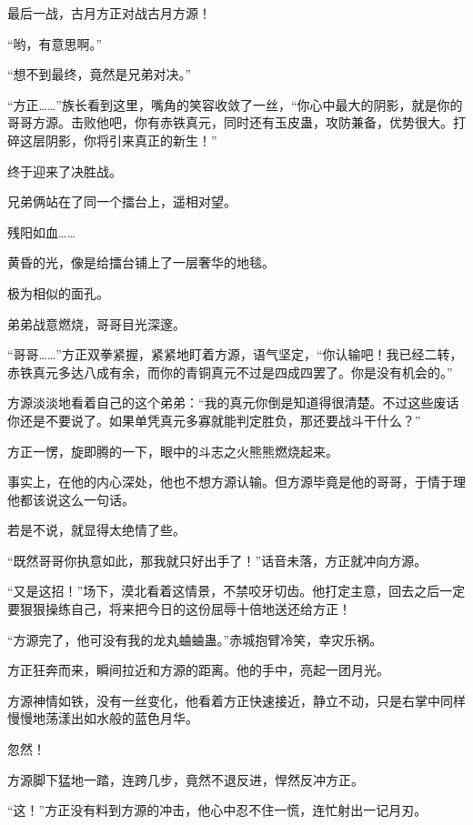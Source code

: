 
\begin{this_body}

最后一战，古月方正对战古月方源！

“哟，有意思啊。”

“想不到最终，竟然是兄弟对决。”

“方正……”族长看到这里，嘴角的笑容收敛了一丝，“你心中最大的阴影，就是你的哥哥方源。击败他吧，你有赤铁真元，同时还有玉皮蛊，攻防兼备，优势很大。打碎这层阴影，你将引来真正的新生！”

终于迎来了决胜战。

兄弟俩站在了同一个擂台上，遥相对望。

残阳如血……

黄昏的光，像是给擂台铺上了一层奢华的地毯。

极为相似的面孔。

弟弟战意燃烧，哥哥目光深邃。

“哥哥……”方正双拳紧握，紧紧地盯着方源，语气坚定，“你认输吧！我已经二转，赤铁真元多达八成有余，而你的青铜真元不过是四成四罢了。你是没有机会的。”

方源淡淡地看着自己的这个弟弟：“我的真元你倒是知道得很清楚。不过这些废话你还是不要说了。如果单凭真元多寡就能判定胜负，那还要战斗干什么？”

方正一愣，旋即腾的一下，眼中的斗志之火熊熊燃烧起来。

事实上，在他的内心深处，他也不想方源认输。但方源毕竟是他的哥哥，于情于理他都该说这么一句话。

若是不说，就显得太绝情了些。

“既然哥哥你执意如此，那我就只好出手了！”话音未落，方正就冲向方源。

“又是这招！”场下，漠北看着这情景，不禁咬牙切齿。他打定主意，回去之后一定要狠狠操练自己，将来把今日的这份屈辱十倍地送还给方正！

“方源完了，他可没有我的龙丸蛐蛐蛊。”赤城抱臂冷笑，幸灾乐祸。

方正狂奔而来，瞬间拉近和方源的距离。他的手中，亮起一团月光。

方源神情如铁，没有一丝变化，他看着方正快速接近，静立不动，只是右掌中同样慢慢地荡漾出如水般的蓝色月华。

忽然！

方源脚下猛地一踏，连跨几步，竟然不退反进，悍然反冲方正。

“这！”方正没有料到方源的冲击，他心中忍不住一慌，连忙射出一记月刃。


\end{this_body}

